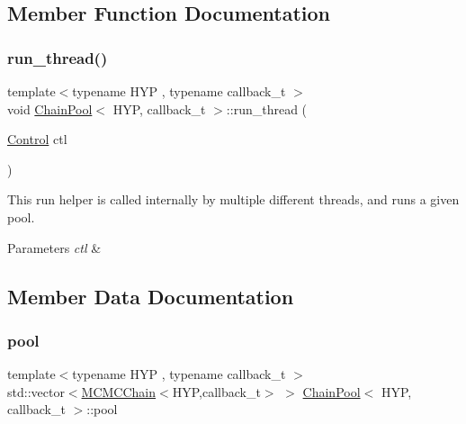 \subsection{Member Function Documentation}
\mbox{\label{class_chain_pool_a6bbed8ddd9a46f5821bfcb1d10f9ac9b}} 
\subsubsection{\texorpdfstring{run\+\_\+thread()}{run\_thread()}}
{\footnotesize\ttfamily template$<$typename H\+YP , typename callback\+\_\+t $>$ \\
void \hyperlink{class_chain_pool}{Chain\+Pool}$<$ H\+YP, callback\+\_\+t $>$\+::run\+\_\+thread (\begin{DoxyParamCaption}\item[{\hyperlink{struct_control}{Control}}]{ctl }\end{DoxyParamCaption})\hspace{0.3cm}{\ttfamily [inline]}}



This run helper is called internally by multiple different threads, and runs a given pool. 


\begin{DoxyParams}{Parameters}
{\em ctl} & \\
\hline
\end{DoxyParams}


\subsection{Member Data Documentation}
\mbox{\label{class_chain_pool_af89400f6e9a2312fe2ee7873745a6e91}} 
\subsubsection{\texorpdfstring{pool}{pool}}
{\footnotesize\ttfamily template$<$typename H\+YP , typename callback\+\_\+t $>$ \\
std\+::vector$<$\hyperlink{class_m_c_m_c_chain}{M\+C\+M\+C\+Chain}$<$H\+YP,callback\+\_\+t$>$ $>$ \hyperlink{class_chain_pool}{Chain\+Pool}$<$ H\+YP, callback\+\_\+t $>$\+::pool}

